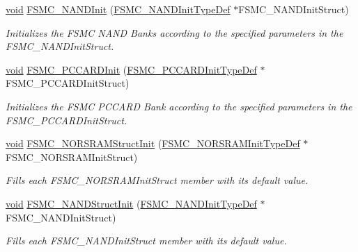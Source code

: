 \begin{DoxyCompactItemize}
\hyperlink{usb__devapi_8h_afabf60e7f57651d6d595a02c75f07cd0}{void} \hyperlink{group___f_s_m_c___private___functions_ga9f81ccc4e126c11f1eb33077b1a68e6f}{F\+S\+M\+C\+\_\+\+N\+A\+N\+D\+Init} (\hyperlink{struct_f_s_m_c___n_a_n_d_init_type_def}{F\+S\+M\+C\+\_\+\+N\+A\+N\+D\+Init\+Type\+Def} $\ast$F\+S\+M\+C\+\_\+\+N\+A\+N\+D\+Init\+Struct)
\begin{DoxyCompactList}\small\item\em Initializes the F\+S\+MC N\+A\+ND Banks according to the specified parameters in the F\+S\+M\+C\+\_\+\+N\+A\+N\+D\+Init\+Struct. \end{DoxyCompactList}\item 
\hyperlink{usb__devapi_8h_afabf60e7f57651d6d595a02c75f07cd0}{void} \hyperlink{group___f_s_m_c___private___functions_gacee1351363e7700a296faa1734a910aa}{F\+S\+M\+C\+\_\+\+P\+C\+C\+A\+R\+D\+Init} (\hyperlink{struct_f_s_m_c___p_c_c_a_r_d_init_type_def}{F\+S\+M\+C\+\_\+\+P\+C\+C\+A\+R\+D\+Init\+Type\+Def} $\ast$F\+S\+M\+C\+\_\+\+P\+C\+C\+A\+R\+D\+Init\+Struct)
\begin{DoxyCompactList}\small\item\em Initializes the F\+S\+MC P\+C\+C\+A\+RD Bank according to the specified parameters in the F\+S\+M\+C\+\_\+\+P\+C\+C\+A\+R\+D\+Init\+Struct. \end{DoxyCompactList}\item 
\hyperlink{usb__devapi_8h_afabf60e7f57651d6d595a02c75f07cd0}{void} \hyperlink{group___f_s_m_c___private___functions_gaf33e6dfc34f62d16a0cb416de9e83d28}{F\+S\+M\+C\+\_\+\+N\+O\+R\+S\+R\+A\+M\+Struct\+Init} (\hyperlink{struct_f_s_m_c___n_o_r_s_r_a_m_init_type_def}{F\+S\+M\+C\+\_\+\+N\+O\+R\+S\+R\+A\+M\+Init\+Type\+Def} $\ast$F\+S\+M\+C\+\_\+\+N\+O\+R\+S\+R\+A\+M\+Init\+Struct)
\begin{DoxyCompactList}\small\item\em Fills each F\+S\+M\+C\+\_\+\+N\+O\+R\+S\+R\+A\+M\+Init\+Struct member with its default value. \end{DoxyCompactList}\item 
\hyperlink{usb__devapi_8h_afabf60e7f57651d6d595a02c75f07cd0}{void} \hyperlink{group___f_s_m_c___private___functions_ga8283ad94ad8e83d49d5b77d1c7e17862}{F\+S\+M\+C\+\_\+\+N\+A\+N\+D\+Struct\+Init} (\hyperlink{struct_f_s_m_c___n_a_n_d_init_type_def}{F\+S\+M\+C\+\_\+\+N\+A\+N\+D\+Init\+Type\+Def} $\ast$F\+S\+M\+C\+\_\+\+N\+A\+N\+D\+Init\+Struct)
\begin{DoxyCompactList}\small\item\em Fills each F\+S\+M\+C\+\_\+\+N\+A\+N\+D\+Init\+Struct member with its default value. \end{DoxyCompactList}\item 

\end{DoxyCompactItemize}
